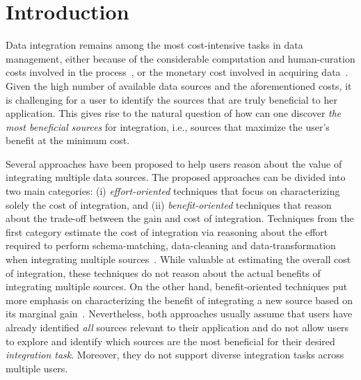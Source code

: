 \documentclass{vldb}
\begin{document}
\section{Introduction}
\label{sec:intro}
Data integration remains among the most cost-intensive tasks in data management, either because of the considerable computation and human-curation costs involved in the process~\cite{kruse2015estimating}, or the monetary cost involved in acquiring data~\cite{balazinska:vldb11}. Given the high number of available data sources and the aforementioned costs, it is challenging for a user to identify the sources that are truly beneficial to her application. This gives rise to the natural question of how can one discover {\em the most beneficial sources} for integration, i.e., sources that maximize the user's benefit at the minimum cost. 

Several approaches have been proposed to help users reason about the value of integrating multiple data sources. The proposed approaches can be divided into two main categories: (i) {\em effort-oriented} techniques that focus on characterizing solely the cost of integration, and (ii) {\em benefit-oriented} techniques that reason about the trade-off between the gain and cost of integration. Techniques from the first category estimate the cost of integration via reasoning about the effort required to perform schema-matching, data-cleaning and data-transformation when integrating multiple sources~\cite{kruse2015estimating, smith:2009}. While valuable at estimating the overall cost of integration, these techniques do not reason about the actual benefits of integrating multiple sources. On the other hand, benefit-oriented techniques put more emphasis on characterizing the benefit of integrating a new source based on its marginal gain~\cite{dong:vldb13,rekatsinas:2014}. Nevertheless, both approaches usually assume that users have already identified {\em all} sources relevant to their application and do not allow users to explore and identify which sources are the most beneficial for their desired {\em integration task}. Moreover, they do not support diverse integration tasks across multiple users.
\end{document}
